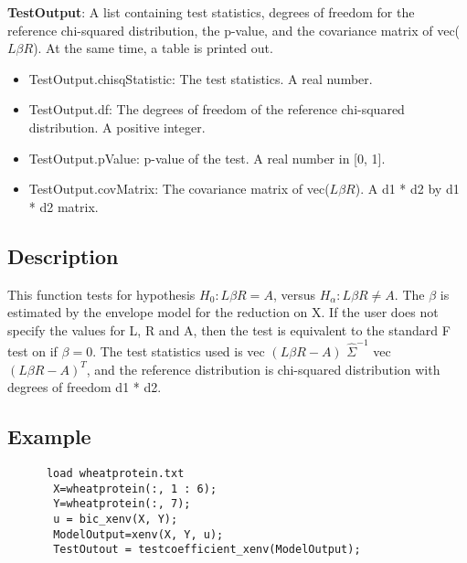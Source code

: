 \documentclass[a4paper,11pt,openany]{memoir}
\begin{document}
\begin{par}
\textbf{TestOutput}: A list containing test statistics, degrees of freedom for the reference chi-squared distribution, the p-value, and the covariance matrix of vec($L\beta R$).  At the same time, a table is printed out.
\end{par} \vspace{1em}
\begin{itemize}
\setlength{\itemsep}{-1ex}
   \item TestOutput.chisqStatistic: The test statistics. A real number.
   \item TestOutput.df: The degrees of freedom of the reference chi-squared distribution.  A positive integer.
   \item TestOutput.pValue: p-value of the test.  A real number in [0, 1].
   \item TestOutput.covMatrix: The covariance matrix of vec($L\beta R$). A d1 * d2 by d1 * d2 matrix.
\end{itemize}


\subsection*{Description}

\begin{par}
This function tests for hypothesis $H_0: L\beta R = A$, versus $H_\alpha: L\beta R\neq A$.  The $\beta$ is estimated by the envelope model for the reduction on X.  If the user does not specify the values for L, R and A, then the test is equivalent to the standard F test on if $\beta = 0$.  The test statistics used is vec $(L\beta R - A)$ $\hat{\Sigma}^{-1}$ vec $(L\beta R - A)^{T}$, and the reference distribution is chi-squared distribution with degrees of freedom d1 * d2.
\end{par} \vspace{1em}


\subsection*{Example}


\begin{verbatim}      load wheatprotein.txt
       X=wheatprotein(:, 1 : 6);
       Y=wheatprotein(:, 7);
       u = bic_xenv(X, Y);
       ModelOutput=xenv(X, Y, u);
       TestOutout = testcoefficient_xenv(ModelOutput);\end{verbatim}
    
\end{document}
